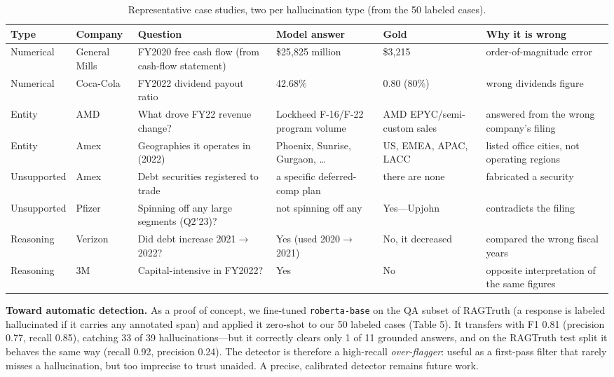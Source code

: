 \documentclass[11pt]{article}
\begin{document}
\begin{table}[t]\centering\footnotesize
\begin{tabular}{p{1.0cm}p{1.5cm}p{3.2cm}p{3.0cm}p{2.4cm}p{3.0cm}}
\toprule
Type & Company & Question & Model answer & Gold & Why it is wrong \\
\midrule
Numerical & General Mills & FY2020 free cash flow (from cash-flow statement) & \$25,825 million & \$3,215 & order-of-magnitude error \\
Numerical & Coca-Cola & FY2022 dividend payout ratio & 42.68\% & 0.80 (80\%) & wrong dividends figure \\
Entity & AMD & What drove FY22 revenue change? & Lockheed F-16/F-22 program volume & AMD EPYC/semi-custom sales & answered from the wrong company's filing \\
Entity & Amex & Geographies it operates in (2022) & Phoenix, Sunrise, Gurgaon, \ldots & US, EMEA, APAC, LACC & listed office cities, not operating regions \\
Unsupported & Amex & Debt securities registered to trade & a specific deferred-comp plan & there are none & fabricated a security \\
Unsupported & Pfizer & Spinning off any large segments (Q2'23)? & not spinning off any & Yes---Upjohn & contradicts the filing \\
Reasoning & Verizon & Did debt increase 2021$\rightarrow$2022? & Yes (used 2020$\rightarrow$2021) & No, it decreased & compared the wrong fiscal years \\
Reasoning & 3M & Capital-intensive in FY2022? & Yes & No & opposite interpretation of the same figures \\
\bottomrule
\end{tabular}
\caption{Representative case studies, two per hallucination type (from the 50 labeled cases).}
\label{tab:cases}
\end{table}

\textbf{Toward automatic detection.} As a proof of concept, we
fine-tuned \texttt{roberta-base} on the QA subset of RAGTruth
\citep{niu2024ragtruth} (a response is labeled hallucinated if it
carries any annotated span) and applied it zero-shot to our 50 labeled
cases (Table 5). It transfers with F1 0.81 (precision 0.77, recall
0.85), catching 33 of 39 hallucinations---but it correctly clears only 1
of 11 grounded answers, and on the RAGTruth test split it behaves the
same way (recall 0.92, precision 0.24). The detector is therefore a
high-recall \emph{over-flagger}: useful as a first-pass filter that
rarely misses a hallucination, but too imprecise to trust unaided. A
precise, calibrated detector remains future work.
\end{document}
